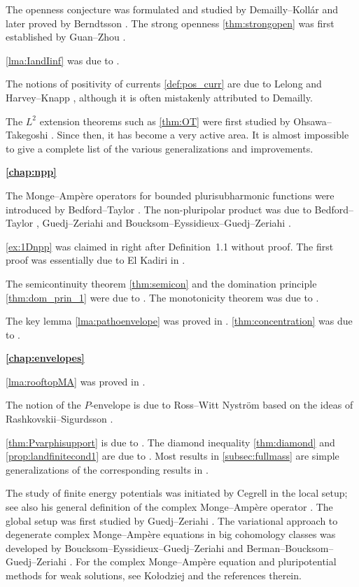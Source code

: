 The openness conjecture was formulated and studied by Demailly--Koll\'ar \cite{DK01} and later proved by Berndtsson \cite{Bern13b}. The strong openness \cref{thm:strongopen} was first established by Guan--Zhou \cite{GZ15}.

\cref{lma:IandIinf} was due to \cite[Proposition~4.1.6]{Dem15}.

The notions of positivity of currents \cref{def:pos_curr} are due to Lelong \cite{Lel68} and Harvey--Knapp \cite{HK74}, although it is often mistakenly attributed to Demailly.

The $L^2$ extension theorems such as \cref{thm:OT} were first studied by Ohsawa--Takegoshi \cite{OT87}. Since then, it has become a very active area. It is almost impossible to give a complete list of the various generalizations and improvements.

\textbf{\cref{chap:npp}}

The Monge--Amp\`ere operators for bounded plurisubharmonic functions were introduced by Bedford--Taylor \cite{BT76, BT82}. The non-pluripolar product was due to Bedford--Taylor \cite{BT87}, Guedj--Zeriahi \cite{GZ07} and Boucksom--Eyssidieux--Guedj--Zeriahi \cite{BEGZ10}.

\cref{ex:1Dnpp} was claimed in \cite{BEGZ10} right after Definition~1.1 without proof. The first proof was essentially due to El Kadiri in \cite{EK24}.

The semicontinuity theorem \cref{thm:semicon} and the domination principle \cref{thm:dom_prin_1} were due to \cite{DDNL18fullmass}. The monotonicity theorem was due to \cite{WN19, DDNL18mono}.

The key lemma \cref{lma:pathoenvelope} was proved in \cite{DDNLmetric}. \cref{thm:concentration} was due to \cite{DDNLsurv}.

\textbf{\cref{chap:envelopes}}

\cref{lma:rooftopMA} was proved in \cite[Lemma~3.7]{DDNL18mono}.

The notion of the $P$-envelope is due to Ross--Witt Nystr\"om \cite{RWN14} based on the ideas of Rashkovskii--Sigurdsson \cite{RS05}.

\cref{thm:Pvarphisupport} is due to \cite[Theorem~3.8]{DDNL18mono}. The diamond inequality \cref{thm:diamond} and \cref{prop:landfinitecond1} are due to \cite[Theorem~5.4]{DDNLmetric}. Most results in \cref{subsec:fullmass} are simple generalizations of the corresponding results in \cite{DDNL18big, DDNL18fullmass}.

The study of finite energy potentials was initiated by Cegrell \cite{Ceg98} in the local setup; see also his general definition of the complex Monge--Amp\`ere operator \cite{Ceg04}. The global setup was first studied by Guedj--Zeriahi \cite{GZ07}. The variational approach to degenerate complex Monge--Amp\`ere equations in big cohomology classes was developed by Boucksom--Eyssidieux--Guedj--Zeriahi \cite{BEGZ10} and Berman--Boucksom--Guedj--Zeriahi \cite{BBGZ13}. For the complex Monge--Amp\`ere equation and pluripotential methods for weak solutions, see Ko{\l}odziej \cite{Kol98, Kol05} and the references therein.

